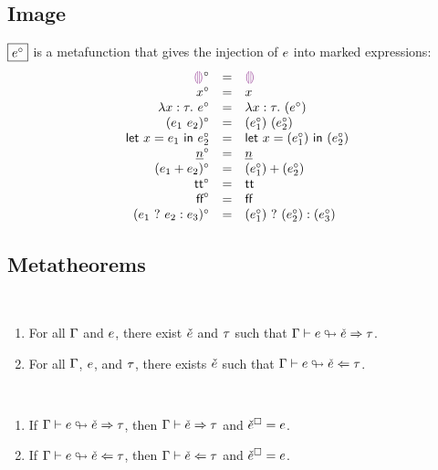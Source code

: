 \documentclass{article}
\begin{document}
\subsection{Image}
$\judgbox{\image{\EMV}}$ is a metafunction that gives the injection of $e$ into marked
expressions:
%
\newcommand{\imageIsRow}[2]{\image{#1} & = & #2}
\[\begin{array}{rcl}
  \imageIsRow{\EEHole}{\ECEHole} \\
  \imageIsRow{x}{x} \\
  \imageIsRow{\ELam{x}{\TMV}{\EMV}}{\ECLam{x}{\TMV}{(\image{\EMV})}} \\
  \imageIsRow{(\EAp{\EMV_1}{\EMV_2})}{\ECAp{(\image{\EMV_1})}{(\image{\EMV_2})}} \\
  \imageIsRow{\ELet{x}{\EMV_1}{\EMV_2}}{\ECLet{x}{(\image{\EMV_1})}{(\image{\EMV_2})}} \\
  \imageIsRow{\ENumMV}{\ECNumMV} \\
  \imageIsRow{(\EPlus{\EMV_1}{\EMV_2})}{\ECPlus{(\image{\EMV_1})}{(\image{\EMV_2})}} \\
  \imageIsRow{\ETrue}{\ECTrue} \\
  \imageIsRow{\EFalse}{\ECFalse} \\
  \imageIsRow{(\EIf{\EMV_1}{\EMV_2}{\EMV_3})}{\ECIf{(\image{\EMV_1})}{(\image{\EMV_2})}{(\image{\EMV_3})}} \\
\end{array}\]

\subsection{Metatheorems}
\begin{theorem}[name=Marking Totality] \
  \begin{enumerate}
    \item For all $\Gamma$ and $e$, there exist $\check{e}$ and $\tau$ such that
      $\Gamma \vdash e \looparrowright \check{e} \Rightarrow \tau$.
    \item For all $\Gamma$, $e$, and $\tau$, there exists $\check{e}$ such that
      $\Gamma \vdash e \looparrowright \check{e} \Leftarrow \tau$.
  \end{enumerate}
\end{theorem}

\begin{theorem}[name=Marking Well-Formedness] \
  \begin{enumerate}
    \item If $\Gamma \vdash e \looparrowright \check{e} \Rightarrow \tau$, then $\Gamma \vdash \check{e} \Rightarrow \tau$ and
      $\check{e}^{\square} = e$.
    \item If $\Gamma \vdash e \looparrowright \check{e} \Leftarrow \tau$, then $\Gamma \vdash \check{e} \Leftarrow \tau$ and
      $\check{e}^{\square} = e$.
  \end{enumerate}
\end{theorem}
\end{document}
